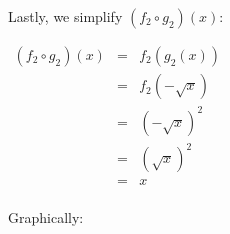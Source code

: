 \documentclass{ximera}
\begin{document}
Lastly, we simplify $(f_{2} \circ g_{2})(x)$:

\begin{center}
$\begin{array}{rcl}

(f_{2} \circ g_{2})(x) & = & f_{2}(g_{2}(x))  \\
                                & = & f_{2}(-\sqrt{x})  \\
                                & = & (-\sqrt{x})^2   \\
                                 & = & (\sqrt{x})^2   \\
                                & = & x \\

\end{array}$
\end{center}




Graphically:
\end{document}
